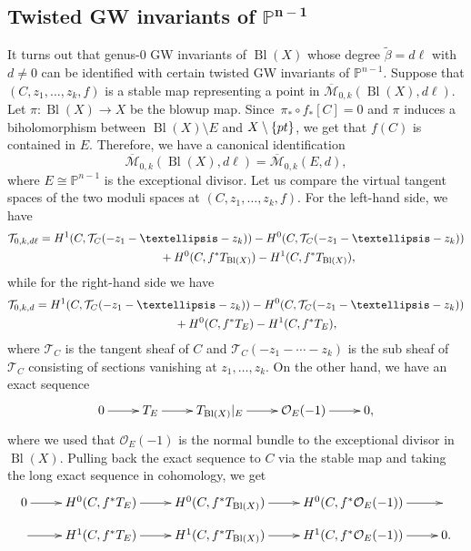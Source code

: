 \documentclass[10pt,a4paper]{article}
\numberwithin{equation}{section}
\newcommand{\PP}{\mathbb{P}}
\newcommand{\T}{\mathcal{T}}
\begin{document}
\subsection[Twisted GW invariants of P\^\{n-1\}]{Twisted GW invariants of $\boldsymbol{\PP^{n-1}}$}\label{sec:proj-tw-GW}

It turns out that genus-0 GW invariants of $\operatorname{Bl}(X)$ whose degree $\widetilde{\beta}= d\ell$ with $d\neq 0$ can be identified with certain twisted GW invariants of $\PP^{n-1}$.
Suppose that $(C,z_1,\dots,z_k,f)$ is a stable map representing a point in $\overline{\mathcal{M}}_{0,k}(\operatorname{Bl}(X), d\ell)$. Let $\pi\colon \operatorname{Bl}(X)\to X$ be the blowup map. Since~${\pi_*\circ f_*[C]=0}$ and $\pi$ induces a biholomorphism between $\operatorname{Bl}(X)\setminus{E}$ and $X\setminus{\{\rm pt \}}$, we get that $f(C)$ is contained in $E$. Therefore, we have a canonical identification
\[
\overline{\mathcal{M}}_{0,k}(\operatorname{Bl}(X), d\ell) =
\overline{\mathcal{M}}_{0,k}(E, d),
\]
where $E\cong \PP^{n-1}$ is the exceptional divisor. Let us compare the virtual tangent spaces of the two moduli spaces at $(C,z_1,\dots,z_k,f)$. For the left-hand side, we have
\begin{gather*}
\T_{0,k,d\ell} =
H^1(C,\T_C(-z_1-\dots -z_k)) -
H^0(C,\T_C(-z_1-\dots -z_k)) \\
\hphantom{\T_{0,k,d\ell} =}{}
+
H^0(C,f^*T_{\operatorname{Bl}(X)}) -
H^1(C, f^*T_{\operatorname{Bl}(X)}),
\end{gather*}
while for the right-hand side we have
\begin{gather*}
\T_{0,k,d} =
H^1(C,\T_C(-z_1-\dots -z_k)) -
H^0(C,\T_C(-z_1-\dots -z_k)) \\
\hphantom{\T_{0,k,d} =}{} +
H^0(C,f^*T_{E}) -
H^1(C, f^*T_{E}),
\end{gather*}
where $\T_C$ is the tangent sheaf of $C$ and $\T_C(-z_1-\cdots -z_k)$ is the sub sheaf of $\T_C$ consisting of sections vanishing at $z_1,\dots, z_k$.
On the other hand, we have an exact sequence
\[
\xymatrix{0\ar[r] &
 T_E \ar[r] &
 T_{\operatorname{Bl}(X)}|_E \ar[r] &
 \mathcal{O}_E(-1) \ar[r] & 0,}
\]
where we used that $\mathcal{O}_E(-1)$ is the normal bundle to the exceptional divisor in $\operatorname{Bl}(X)$. Pulling back the exact sequence to $C$ via the stable map and taking the long exact sequence in cohomology, we get
\[
\xymatrix@R=0.8em{0\ar[r] &
 H^0(C,f^*T_E) \ar[r] &
 H^0(C,f^*T_{\operatorname{Bl}(X)}) \ar[r] &
 H^0(C,f^*\mathcal{O}_E(-1)) \ar[r] & \\
 {}\ar[r] &
H^1(C,f^*T_E) \ar[r] &
H^1(C,f^*T_{\operatorname{Bl}(X)}) \ar[r] &
H^1(C,f^*\mathcal{O}_E(-1)) \ar[r] & 0.}
\]
\end{document}
